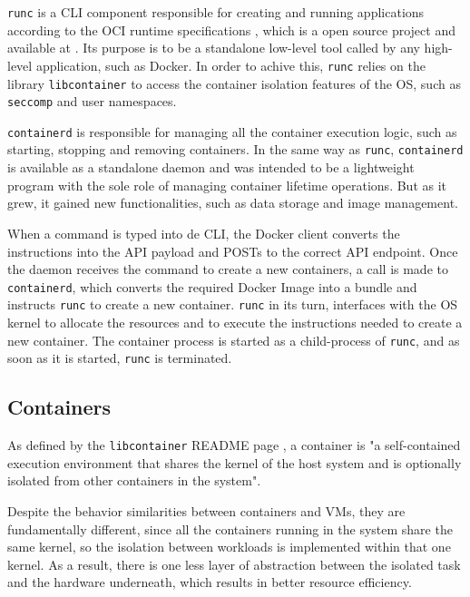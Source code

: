 \texttt{runc} is a \ac{CLI} component responsible for creating and running applications according to the \ac{OCI} runtime specifications \cite{oci-runc}, which is a open source project and available at \cite{git-runc}. Its purpose is to be a standalone low-level tool called by any high-level application, such as Docker. In order to achive this, \texttt{runc} relies on the library \texttt{libcontainer} to access the container isolation features of the \ac{OS}, such as \texttt{seccomp} and user namespaces\cite{runc-estes}.

\texttt{containerd} is responsible for managing all the container execution logic, such as starting, stopping and removing containers. In the same way as \texttt{runc}, \texttt{containerd} is available as a standalone daemon and was intended to be a lightweight program with the sole role of managing container lifetime operations. But as it grew, it gained new functionalities, such as data storage and image management\cite{docker-containerd}.

When a command is typed into de \ac{CLI}, the Docker client converts the instructions into the \ac{API} payload and POSTs to the correct API endpoint. Once the daemon receives the command to create a new containers, a call is made to \texttt{containerd}, which converts the required Docker Image into a bundle and instructs \texttt{runc} to create a new container. \texttt{runc} in its turn, interfaces with the \ac{OS} kernel to allocate the resources and to execute the instructions needed to create a new container. The container process is started as a child-process of \texttt{runc}, and as soon as it is started, \texttt{runc} is terminated.

\subsection{Containers}
\label{sec::arch:containers}
As defined by the \texttt{libcontainer} README page \cite{docker-libcontainer}, a container is "a self-contained execution environment that shares the kernel of the host system and is optionally isolated from other containers in the system".

Despite the behavior similarities between containers and \acp{VM}, they are fundamentally different, since all the containers running in the system share the same kernel, so the isolation between workloads is implemented within that one kernel. As a result, there is one less layer of abstraction between the isolated task and the hardware underneath, which results in better resource efficiency.

